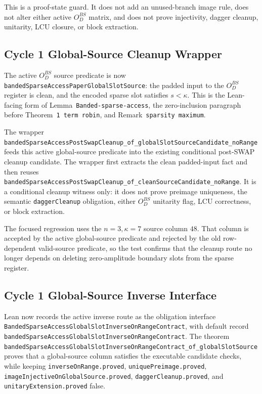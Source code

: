 This is a proof-state guard.  It does not add an unused-branch image rule,
does not alter either active \(O_D^{BS}\) matrix, and does not prove
injectivity, dagger cleanup, unitarity, LCU closure, or block extraction.

\subsection{Cycle 1 Global-Source Cleanup Wrapper}

The active \(O_D^{BS}\) source predicate is now
\texttt{bandedSparseAccessPaperGlobalSlotSource}: the padded input to the
\(O_D^{BS}\) register is clean, and the encoded sparse slot satisfies
\(s<\kappa\).  This is the Lean-facing form of Lemma~\texttt{Banded-sparse-access},
the zero-inclusion paragraph before Theorem~\texttt{1 term robin}, and
Remark~\texttt{sparsity maximum}.

The wrapper
\texttt{bandedSparseAccessPostSwapCleanup\_of\_globalSlotSourceCandidate\_noRange}
feeds this active global-source predicate into the existing conditional
post-SWAP cleanup candidate.  The wrapper first extracts the clean padded-input
fact and then reuses
\texttt{bandedSparseAccessPostSwapCleanup\_of\_cleanSourceCandidate\_noRange}.
It is a conditional cleanup witness only: it does not prove preimage
uniqueness, the semantic \texttt{daggerCleanup} obligation, either
\(O_D^{BS}\) unitarity flag, LCU correctness, or block extraction.

The focused regression uses the \(n=3,\kappa=7\) source column \(48\).  That
column is accepted by the active global-source predicate and rejected by the
old row-dependent valid-source predicate, so the test confirms that the
cleanup route no longer depends on deleting zero-amplitude boundary slots from
the sparse register.

\subsection{Cycle 1 Global-Source Inverse Interface}

Lean now records the active inverse route as the obligation interface
\texttt{BandedSparseAccessGlobalSlotInverseOnRangeContract}, with default
record \texttt{bandedSparseAccessGlobalSlotInverseOnRangeContract}.  The
theorem
\texttt{bandedSparseAccessGlobalSlotInverseOnRangeContract\_of\_globalSlotSource}
proves that a global-source column satisfies the executable candidate checks,
while keeping \texttt{inverseOnRange.proved},
\texttt{uniquePreimage.proved},
\texttt{imageInjectiveOnGlobalSource.proved},
\texttt{daggerCleanup.proved}, and \texttt{unitaryExtension.proved} false.

